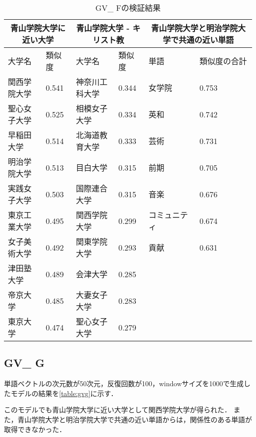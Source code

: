 \begin{table}[H]
\caption{GV\_ Fの検証結果}
\centering
\footnotesize
\begin{tabular}{ll|ll|ll}
\hline
\multicolumn{2}{c}{青山学院大学に近い大学} & \multicolumn{2}{c}{青山学院大学 - キリスト教} & \multicolumn{2}{c}{青山学院大学と明治学院大学で共通の近い単語}
\\ \hline
大学名 & 類似度 & 大学名 & 類似度 & 単語 & 類似度の合計
\\ \hline \hline
関西学院大学 & 0.541 & 神奈川工科大学 & 0.344 & 女学院 & 0.753\\
聖心女子大学 & 0.525 & 相模女子大学 & 0.334 & 英和 & 0.742\\
早稲田大学 & 0.514 & 北海道教育大学 & 0.333 & 芸術 & 0.731\\
明治学院大学 & 0.513 & 目白大学 & 0.315 & 前期 & 0.705\\
実践女子大学 & 0.503 & 国際連合大学 & 0.315 & 音楽 & 0.676\\
東京工業大学 & 0.495 & 関西学院大学 & 0.299 & コミュニティ & 0.674\\
女子美術大学 & 0.492 & 関東学院大学 & 0.293 & 貢献 & 0.631\\
津田塾大学 & 0.489 & 会津大学 & 0.285 & & \\
帝京大学 & 0.485 & 大妻女子大学 & 0.283 & & \\
東京大学 & 0.474 & 聖心女子大学 & 0.279 & & \\ \hline
\end{tabular}
\label{table:gvf}
\end{table}


\subsection{GV\_ G}
単語ベクトルの次元数が50次元，反復回数が100，windowサイズを1000で生成したモデルの結果を\ref{table:gvg}に示す．

このモデルでも青山学院大学に近い大学として関西学院大学が得られた．
また，青山学院大学と明治学院大学で共通の近い単語からは，関係性のある単語が取得できなかった．

